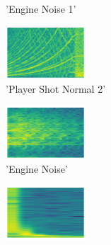 \begin{figure}[H]
{\begin{subfigure}{0.23\textwidth}
{{        }\hspace*{0.75cm}%
      }%
      \caption*{'Engine Noise 1'}
    \end{subfigure}
    \begin{subfigure}{0.23\textwidth}
      \includegraphics[width=3cm]{sounds/buttons/04.wav-button.png}%
      \caption*{'Player Shot Normal 2'}
    \end{subfigure}
    \begin{subfigure}{0.23\textwidth}
      \includegraphics[width=3cm]{sounds/buttons/05.wav-button.png}%
      \caption*{'Engine Noise'}
    \end{subfigure}
    \begin{subfigure}{0.23\textwidth}
      \includegraphics[width=3cm]{sounds/buttons/06.wav-button.png}%
\end{subfigure}}
\end{figure}
